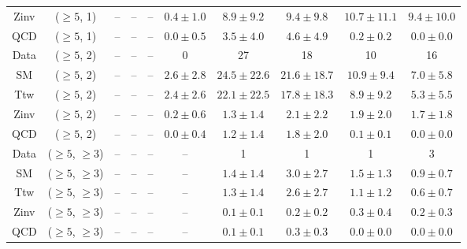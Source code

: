 \begin{table}[h!]
{\begin{tabular}{cccccccccc}
	Zinv & ($\ge5$, 1) & -- & -- & -- & $0.4\pm 1.0$ & $8.9\pm 9.2$ & $9.4\pm 9.8$ & $10.7\pm 11.1$ & $9.4\pm 10.0$ \\[0.5ex] 
	QCD & ($\ge5$, 1) & -- & -- & -- & $0.0\pm 0.5$ & $3.5\pm 4.0$ & $4.6\pm 4.9$ & $0.2\pm 0.2$ & $0.0\pm 0.0$ \\[0.5ex] 
	Data & ($\ge5$, 2) & -- & -- & -- & 0 & 27 & 18 & 10 & 16 \\[0.5ex] 
	SM & ($\ge5$, 2) & -- & -- & -- & $2.6\pm 2.8$ & $24.5\pm 22.6$ & $21.6\pm 18.7$ & $10.9\pm 9.4$ & $7.0\pm 5.8$ \\[0.5ex] 
	Ttw & ($\ge5$, 2) & -- & -- & -- & $2.4\pm 2.6$ & $22.1\pm 22.5$ & $17.8\pm 18.3$ & $8.9\pm 9.2$ & $5.3\pm 5.5$ \\[0.5ex] 
	Zinv & ($\ge5$, 2) & -- & -- & -- & $0.2\pm 0.6$ & $1.3\pm 1.4$ & $2.1\pm 2.2$ & $1.9\pm 2.0$ & $1.7\pm 1.8$ \\[0.5ex] 
	QCD & ($\ge5$, 2) & -- & -- & -- & $0.0\pm 0.4$ & $1.2\pm 1.4$ & $1.8\pm 2.0$ & $0.1\pm 0.1$ & $0.0\pm 0.0$ \\[0.5ex] 
	Data & ($\ge5$, $\ge3$) & -- & -- & -- & -- & 1 & 1 & 1 & 3 \\[0.5ex] 
	SM & ($\ge5$, $\ge3$) & -- & -- & -- & -- & $1.4\pm 1.4$ & $3.0\pm 2.7$ & $1.5\pm 1.3$ & $0.9\pm 0.7$ \\[0.5ex] 
	Ttw & ($\ge5$, $\ge3$) & -- & -- & -- & -- & $1.3\pm 1.4$ & $2.6\pm 2.7$ & $1.1\pm 1.2$ & $0.6\pm 0.7$ \\[0.5ex] 
	Zinv & ($\ge5$, $\ge3$) & -- & -- & -- & -- & $0.1\pm 0.1$ & $0.2\pm 0.2$ & $0.3\pm 0.4$ & $0.2\pm 0.3$ \\[0.5ex] 
	QCD & ($\ge5$, $\ge3$) & -- & -- & -- & -- & $0.1\pm 0.1$ & $0.3\pm 0.3$ & $0.0\pm 0.0$ & $0.0\pm 0.0$ \\[0.5ex] 
	\hline
	\hline
\end{tabular}}
\end{table}

